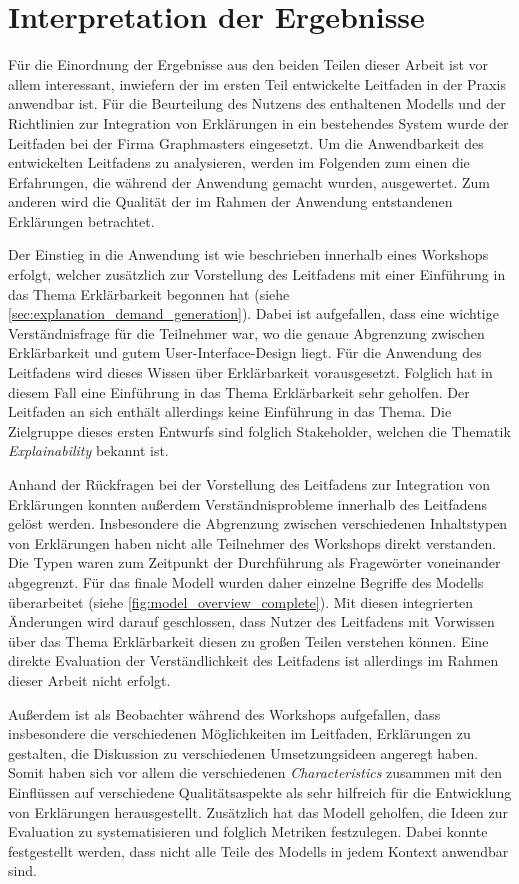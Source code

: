 \section{Interpretation der Ergebnisse}

Für die Einordnung der Ergebnisse aus den beiden Teilen dieser Arbeit ist vor allem interessant, inwiefern der im ersten Teil entwickelte Leitfaden in der Praxis anwendbar ist. Für die Beurteilung des Nutzens des enthaltenen Modells und der Richtlinien zur Integration von Erklärungen in ein bestehendes System wurde der Leitfaden bei der Firma Graphmasters eingesetzt. Um die Anwendbarkeit des entwickelten Leitfadens zu analysieren, werden im Folgenden zum einen die Erfahrungen, die während der Anwendung gemacht wurden, ausgewertet. Zum anderen wird die Qualität der im Rahmen der Anwendung entstandenen Erklärungen betrachtet.

Der Einstieg in die Anwendung ist wie beschrieben innerhalb eines Workshops erfolgt, welcher zusätzlich zur Vorstellung des Leitfadens mit einer Einführung in das Thema Erklärbarkeit begonnen hat (siehe \autoref{sec:explanation_demand_generation}). Dabei ist aufgefallen, dass eine wichtige Verständnisfrage für die Teilnehmer war, wo die genaue Abgrenzung zwischen Erklärbarkeit und gutem User-Interface-Design liegt. Für die Anwendung des Leitfadens wird dieses Wissen über Erklärbarkeit vorausgesetzt. Folglich hat in diesem Fall eine Einführung in das Thema Erklärbarkeit sehr geholfen. Der Leitfaden an sich enthält allerdings keine Einführung in das Thema. Die Zielgruppe dieses ersten Entwurfs sind folglich Stakeholder, welchen die Thematik \textit{Explainability} bekannt ist.

Anhand der Rückfragen bei der Vorstellung des Leitfadens zur Integration von Erklärungen konnten außerdem Verständnisprobleme innerhalb des Leitfadens gelöst werden. Insbesondere die Abgrenzung zwischen verschiedenen Inhaltstypen von Erklärungen haben nicht alle Teilnehmer des Workshops direkt verstanden. Die Typen waren zum Zeitpunkt der Durchführung als Fragewörter voneinander abgegrenzt. Für das finale Modell wurden daher einzelne Begriffe des Modells überarbeitet (siehe \autoref{fig:model_overview_complete}). Mit diesen integrierten Änderungen wird darauf geschlossen, dass Nutzer des Leitfadens mit Vorwissen über das Thema Erklärbarkeit diesen zu großen Teilen verstehen können. Eine direkte Evaluation der Verständlichkeit des Leitfadens ist allerdings im Rahmen dieser Arbeit nicht erfolgt.

Außerdem ist als Beobachter während des Workshops aufgefallen, dass insbesondere die verschiedenen Möglichkeiten im Leitfaden, Erklärungen zu gestalten, die Diskussion zu verschiedenen Umsetzungsideen angeregt haben. Somit haben sich vor allem die verschiedenen \textit{Characteristics} zusammen mit den Einflüssen auf verschiedene Qualitätsaspekte als sehr hilfreich für die Entwicklung von Erklärungen herausgestellt. Zusätzlich hat das Modell geholfen, die Ideen zur Evaluation zu systematisieren und folglich Metriken festzulegen. Dabei konnte festgestellt werden, dass nicht alle Teile des Modells in jedem Kontext anwendbar sind.


